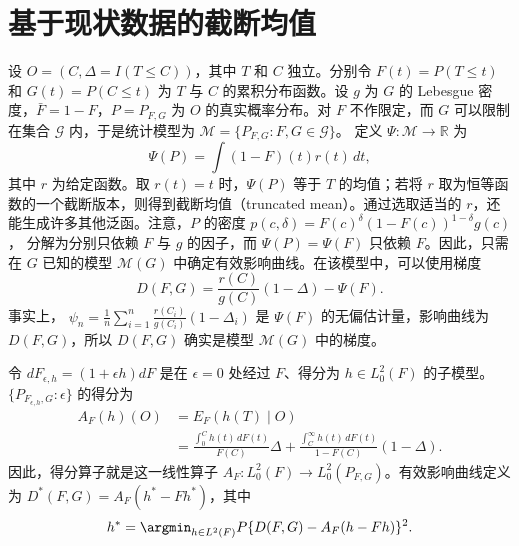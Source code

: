 \section{基于现状数据的截断均值}

设 $O=(C,\Delta=I(T\leq C))$，其中 $T$ 和 $C$ 独立。分别令 $F(t)=P(T\leq t)$ 和 $G(t)=P(C\leq t)$ 为 $T$ 与 $C$ 的累积分布函数。设 $g$ 为 $G$ 的 Lebesgue 密度，$\bar F=1-F$，$P=P_{F,G}$ 为 $O$ 的真实概率分布。对 $F$ 不作限定，而 $G$ 可以限制在集合 $\mathcal G$ 内，于是统计模型为
$\mathcal M=\{P_{F,G}:F,G\in\mathcal G\}$。
定义 $\Psi:\mathcal M\to\mathbb R$ 为
\[
 \Psi(P)=\int(1-F)(t)r(t)\,dt,
\]
其中 $r$ 为给定函数。取 $r(t)=t$ 时，$\Psi(P)$ 等于 $T$ 的均值；若将 $r$ 取为恒等函数的一个截断版本，则得到截断均值（truncated mean）。通过选取适当的 $r$，还能生成许多其他泛函。注意，$P$ 的密度
$p(c,\delta)=F(c)^\delta(1-F(c))^{1-\delta}g(c)$，
分解为分别只依赖 $F$ 与 $g$ 的因子，而 $\Psi(P)=\Psi(F)$ 只依赖 $F$。因此，只需在 $G$ 已知的模型 $\mathcal M(G)$ 中确定有效影响曲线。在该模型中，可以使用梯度
\[
 D(F,G)=\frac{r(C)}{g(C)}(1-\Delta)-\Psi(F).
\]
事实上，
$\psi_n=\frac1n\sum_{i=1}^n\frac{r(C_i)}{g(C_i)}(1-\Delta_i)$
是 $\Psi(F)$ 的无偏估计量，影响曲线为 $D(F,G)$，所以 $D(F,G)$ 确实是模型 $\mathcal M(G)$ 中的梯度。

令 $dF_{\epsilon,h}=(1+\epsilon h)dF$ 是在 $\epsilon=0$ 处经过 $F$、得分为 $h\in L_0^2(F)$ 的子模型。$\{P_{F_{\epsilon,h},G}:\epsilon\}$ 的得分为
\[
 \begin{aligned}
 A_F(h)(O)&=E_F(h(T)\mid O)\\
 &=\frac{\int_0^C h(t)\,dF(t)}{F(C)}\Delta
 +\frac{\int_C^\infty h(t)\,dF(t)}{1-F(C)}(1-\Delta).
 \end{aligned}
\]
因此，得分算子就是这一线性算子 $A_F:L_0^2(F)\to L_0^2(P_{F,G})$。有效影响曲线定义为 $D^*(F,G)=A_F(h^*-Fh^*)$，其中
\[
 h^*=\argmin_{h\in L^2(F)}P\{D(F,G)-A_F(h-Fh)\}^2.
\]


